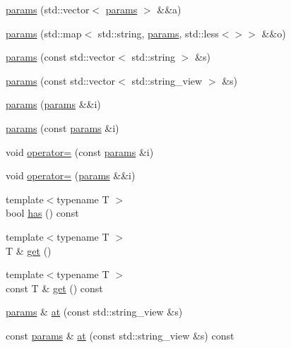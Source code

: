 \begin{DoxyCompactItemize}
\hyperlink{classtelegraph_1_1params_aae149f5beddeae6ed0b3809f70952b49}{params} (std\+::vector$<$ \hyperlink{classtelegraph_1_1params}{params} $>$ \&\&a)
\item 
\hyperlink{classtelegraph_1_1params_a2e508304e48171ca494f38371276d9d8}{params} (std\+::map$<$ std\+::string, \hyperlink{classtelegraph_1_1params}{params}, std\+::less$<$$>$$>$ \&\&o)
\item 
\hyperlink{classtelegraph_1_1params_a8760b698892fb0f7f15c12368ede1352}{params} (const std\+::vector$<$ std\+::string $>$ \&s)
\item 
\hyperlink{classtelegraph_1_1params_a3cd32f5a3ad17d344264f8f08dca2028}{params} (const std\+::vector$<$ std\+::string\+\_\+view $>$ \&s)
\item 
\hyperlink{classtelegraph_1_1params_a668b95fd7d76e5baf7e08da782be0a8f}{params} (\hyperlink{classtelegraph_1_1params}{params} \&\&i)
\item 
\hyperlink{classtelegraph_1_1params_a376590f3f5bc526023b4f7cc43a88ab5}{params} (const \hyperlink{classtelegraph_1_1params}{params} \&i)
\item 
void \hyperlink{classtelegraph_1_1params_a54a2fde46615aa1594942d81e2fccb4d}{operator=} (const \hyperlink{classtelegraph_1_1params}{params} \&i)
\item 
void \hyperlink{classtelegraph_1_1params_a7ad928fc3d3fbabe7d61762e704cc89f}{operator=} (\hyperlink{classtelegraph_1_1params}{params} \&\&i)
\item 
{\footnotesize template$<$typename T $>$ }\\bool \hyperlink{classtelegraph_1_1params_aa9a9a9e8cd24d99b399f9679e394f279}{has} () const
\item 
{\footnotesize template$<$typename T $>$ }\\T \& \hyperlink{classtelegraph_1_1params_ae7407667dc4b073ca73a0329ea23d72a}{get} ()
\item 
{\footnotesize template$<$typename T $>$ }\\const T \& \hyperlink{classtelegraph_1_1params_a108b23437a36e8e92b024b59c9abf2e2}{get} () const
\item 
\hyperlink{classtelegraph_1_1params}{params} \& \hyperlink{classtelegraph_1_1params_a86e283121acc4db6118b63e6df0fafcc}{at} (const std\+::string\+\_\+view \&s)
\item 
const \hyperlink{classtelegraph_1_1params}{params} \& \hyperlink{classtelegraph_1_1params_a85a5101497671f6b85ceeeca666cae81}{at} (const std\+::string\+\_\+view \&s) const
\item 

\end{DoxyCompactItemize}

